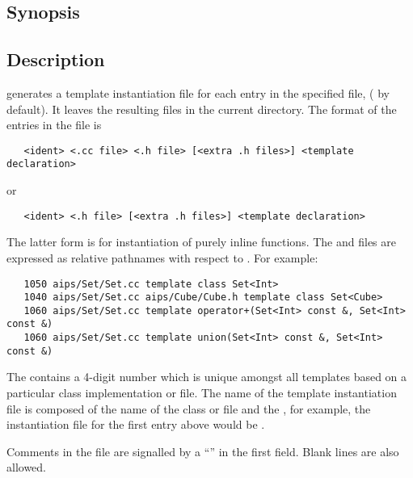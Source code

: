 \subsection*{Synopsis}
 
\begin{synopsis}
\end{synopsis}
 
\subsection*{Description}
 
 generates a template instantiation file for each entry in the
specified file, ( by default).  It leaves the resulting
 files in the current directory.  The format of the entries in the
 file is

\begin{verbatim}
   <ident> <.cc file> <.h file> [<extra .h files>] <template declaration>
\end{verbatim}

\noindent
or

\begin{verbatim}
   <ident> <.h file> [<extra .h files>] <template declaration>
\end{verbatim}

\noindent
The latter form is for instantiation of purely inline functions.  The
 and  files are expressed as relative pathnames with
respect to .  For example:

\begin{verbatim}
   1050 aips/Set/Set.cc template class Set<Int>
   1040 aips/Set/Set.cc aips/Cube/Cube.h template class Set<Cube>
   1060 aips/Set/Set.cc template operator+(Set<Int> const &, Set<Int> const &)
   1060 aips/Set/Set.cc template union(Set<Int> const &, Set<Int> const &)
\end{verbatim}

\noindent
The  contains a 4-digit number which is unique amongst all
templates based on a particular class implementation  or 
file.  The name of the template instantiation  file is composed of
the name of the class  or  file and the , for
example, the instantiation file for the first entry above would be
.

Comments in the  file are signalled by a ``\code{\#}'' in the
first field.  Blank lines are also allowed.

